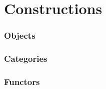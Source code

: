\part{Constructions}

\section{Objects}











\section{Categories}







\section{Functors}






